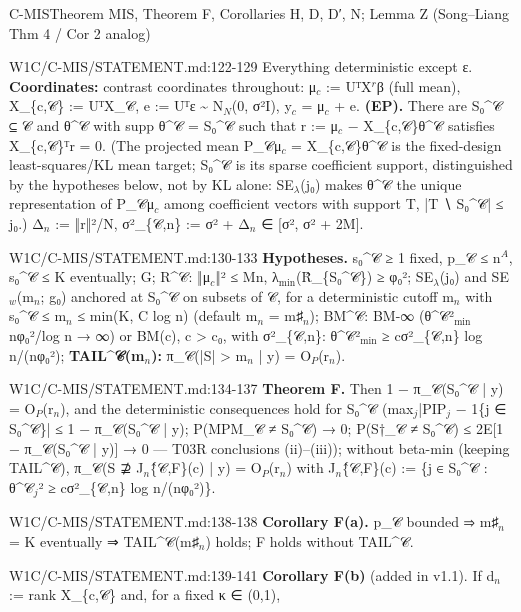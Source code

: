 \begin{card}{C-MIS}{Theorem MIS, Theorem F, Corollaries H, D, D′, N; Lemma Z (Song–Liang Thm 4 / Cor 2 analog)}
\begin{stmt}{W1C/C-MIS/STATEMENT.md:122-129}
Everything deterministic except ε. \textbf{Coordinates:} contrast coordinates throughout: μ$_{c}$ := UᵀX$^{r}$β (full mean),
X\_\{c,𝒞\} := UᵀX\_𝒞, e := Uᵀε \textasciitilde{} N$_{N}$(0, σ²I), y$_{c}$ = μ$_{c}$ + e.
\textbf{(EP).} There are S₀\^{}𝒞 ⊆ 𝒞 and θ\^{}𝒞 with supp θ\^{}𝒞 = S₀\^{}𝒞 such that r := μ$_{c}$ − X\_\{c,𝒞\}θ\^{}𝒞 satisfies X\_\{c,𝒞\}ᵀr = 0.
(The projected mean P\_𝒞μ$_{c}$ = X\_\{c,𝒞\}θ\^{}𝒞 is the fixed-design least-squares/KL mean target; S₀\^{}𝒞 is its sparse
coefficient support, distinguished by the hypotheses below, not by KL alone: SE$_{\lambda}$(j₀) makes θ\^{}𝒞 the unique
representation of P\_𝒞μ$_{c}$ among coefficient vectors with support T, |T ∖ S₀\^{}𝒞| ≤ j₀.) Δ$_{n}$ := ‖r‖²/N, σ²\_\{𝒞,n\} := σ² + Δ$_{n}$ ∈ [σ², σ² + 2M].
\end{stmt}
\begin{stmt}{W1C/C-MIS/STATEMENT.md:130-133}
\textbf{Hypotheses.} s₀\^{}𝒞 ≥ 1 fixed, p\_𝒞 ≤ n$^{A}$, s₀\^{}𝒞 ≤ K eventually; G; R\^{}𝒞: ‖μ$_{c}$‖² ≤ Mn, λ$_{\mathrm{min}}$(R̂\_\{S₀\^{}𝒞\}) ≥ φ₀²;
SE$_{\lambda}$(j₀) and SE$_{w}$(m$_{n}$; g₀) anchored at S₀\^{}𝒞 on subsets of 𝒞, for a deterministic cutoff m$_{n}$ with
s₀\^{}𝒞 ≤ m$_{n}$ ≤ min(K, C log n) (default m$_{n}$ = m♯$_{n}$); BM\^{}𝒞: BM-∞ (θ\^{}𝒞²$_{\mathrm{min}}$ nφ₀²/log n → ∞) or BM(c), c > c₀, with
σ²\_\{𝒞,n\}: θ\^{}𝒞²$_{\mathrm{min}}$ ≥ cσ²\_\{𝒞,n\} log n/(nφ₀²); \textbf{TAIL\^{}𝒞(m$_{n}$):} π\_𝒞(|S| > m$_{n}$ | y) = O$_{P}$(r$_{n}$).
\end{stmt}
\begin{stmt}{W1C/C-MIS/STATEMENT.md:134-137}
\textbf{Theorem F.} Then 1 − π\_𝒞(S₀\^{}𝒞 | y) = O$_{P}$(r$_{n}$), and the deterministic consequences hold for S₀\^{}𝒞
(max$_{j}$|PIP$_{j}$ − 1\{j ∈ S₀\^{}𝒞\}| ≤ 1 − π\_𝒞(S₀\^{}𝒞 | y); P(MPM\_𝒞 ≠ S₀\^{}𝒞) → 0; P(S†\_𝒞 ≠ S₀\^{}𝒞) ≤ 2E[1 − π\_𝒞(S₀\^{}𝒞 | y)] → 0 —
T03R conclusions (ii)–(iii)); without beta-min
(keeping TAIL\^{}𝒞), π\_𝒞(S ⊉ J$_{n}$\^\{𝒞,F\}(c) | y) = O$_{P}$(r$_{n}$) with J$_{n}$\^\{𝒞,F\}(c) := \{j ∈ S₀\^{}𝒞 : θ\^{}𝒞$_{j}$² ≥ cσ²\_\{𝒞,n\} log n/(nφ₀²)\}.
\end{stmt}
\begin{stmt}{W1C/C-MIS/STATEMENT.md:138-138}
\textbf{Corollary F(a).} p\_𝒞 bounded ⇒ m♯$_{n}$ = K eventually ⇒ TAIL\^{}𝒞(m♯$_{n}$) holds; F holds without TAIL\^{}𝒞.
\end{stmt}
\begin{stmt}{W1C/C-MIS/STATEMENT.md:139-141}
\textbf{Corollary F(b)} (added in v1.1). If d$_{n}$ := rank X\_\{c,𝒞\} and, for a fixed κ ∈ (0,1),

\end{stmt}
\end{card}
